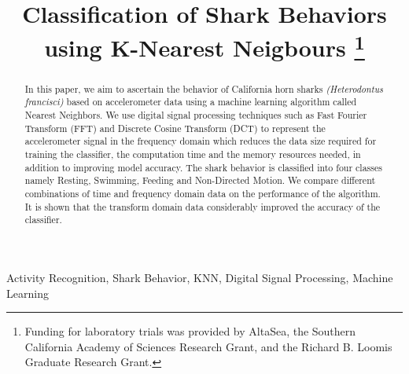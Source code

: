 \documentclass[conference]{IEEEtran}
\begin{document}
\title{Classification of Shark Behaviors using K-Nearest Neigbours \thanks{Funding for laboratory trials was provided by AltaSea, the Southern California Academy of Sciences Research Grant, and the Richard B. Loomis Graduate Research Grant.}
}

\author{
}

\maketitle



\begin{abstract}
In this paper, we aim to ascertain the behavior of California horn sharks \textit{(Heterodontus francisci)} based on accelerometer data using a machine learning algorithm called Nearest Neighbors. We use digital signal processing techniques such as Fast Fourier Transform (FFT) and Discrete Cosine Transform (DCT) to represent the accelerometer signal in the frequency domain which reduces the data size required for training the classifier, the computation time and the memory resources needed, in addition to improving model accuracy. The shark behavior is classified into four classes namely Resting, Swimming, Feeding and Non-Directed Motion. We compare different combinations of time and frequency domain data on the performance of the algorithm. It is shown that the transform domain data considerably improved the accuracy of the classifier.
\end{abstract}

\begin{IEEEkeywords}
Activity Recognition, Shark Behavior, KNN, Digital Signal Processing, Machine Learning
\end{IEEEkeywords}
\end{document}
